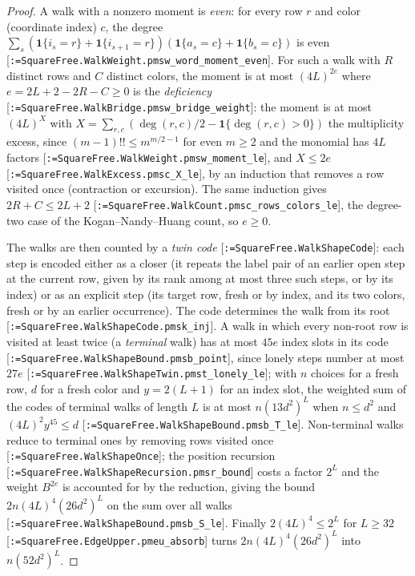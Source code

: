 \documentclass[11pt]{article}
\makeatletter
\newcommand{\formal@break}[1]{\@tfor\formal@tok:=#1\do{%
  \formal@tok
  \expandafter\ifx\formal@tok.\allowbreak\else
  \expandafter\ifx\formal@tok\_\allowbreak\fi\fi}}
\DeclareRobustCommand{\formal}[1]{\textnormal{[\texttt{\small\formal@break{#1}}]}}
\newcommand{\one}{\mathbf{1}}
\theoremstyle{plain}
\theoremstyle{definition}
\makeatother
\begin{document}
\begin{proof}
A walk with a nonzero moment is \emph{even}: for every row $r$ and color
(coordinate index) $c$, the degree
$\sum_s(\one\{i_s = r\} + \one\{i_{s+1} = r\})(\one\{a_s = c\} + \one\{b_s = c\})$
is even \formal{SquareFree.WalkWeight.pmsw\_word\_moment\_even}. For such a
walk with $R$ distinct rows and $C$ distinct colors, the moment is at most
$(4L)^{2e}$ where $e = 2L + 2 - 2R - C \ge 0$ is the \emph{deficiency}
\formal{SquareFree.WalkBridge.pmsw\_bridge\_weight}: the moment is at most
$(4L)^X$ with $X = \sum_{r,c}(\deg(r,c)/2 - \one\{\deg(r,c) > 0\})$ the
multiplicity excess, since $(m-1)!! \le m^{m/2 - 1}$ for even $m \ge 2$ and
the monomial has $4L$ factors \formal{SquareFree.WalkWeight.pmsw\_moment\_le},
and $X \le 2e$ \formal{SquareFree.WalkExcess.pmsc\_X\_le}, by an induction
that removes a row visited once (contraction or excursion). The same
induction gives $2R + C \le 2L + 2$ \formal{SquareFree.WalkCount.pmsc\_rows\_colors\_le},
the degree-two case of the Kogan--Nandy--Huang count, so $e \ge 0$.

The walks are then counted by a \emph{twin code}
\formal{SquareFree.WalkShapeCode}: each step is encoded either as a closer
(it repeats the label pair of an earlier open step at the current row,
given by its rank among at most three such steps, or by its index) or as
an explicit step (its target row, fresh or by index, and its two colors,
fresh or by an earlier occurrence). The code determines the walk from its
root \formal{SquareFree.WalkShapeCode.pmsk\_inj}. A walk in which every
non-root row is visited at least twice (a \emph{terminal} walk) has at most
$45e$ index slots in its code \formal{SquareFree.WalkShapeBound.pmsb\_point},
since lonely steps number at most $27e$ \formal{SquareFree.WalkShapeTwin.pmst\_lonely\_le};
with $n$ choices for a fresh row, $d$ for a fresh color and $y = 2(L+1)$
for an index slot, the weighted sum of the codes of terminal walks of
length $L$ is at most $n(13d^2)^L$ when $n \le d^2$ and
$(4L)^2y^{45} \le d$ \formal{SquareFree.WalkShapeBound.pmsb\_T\_le}.
Non-terminal walks reduce to terminal ones by removing rows visited once
\formal{SquareFree.WalkShapeOnce}; the position recursion
\formal{SquareFree.WalkShapeRecursion.pmsr\_bound} costs a factor $2^L$
and the weight $B^{2e}$ is accounted for by the reduction, giving the bound
$2n(4L)^4(26d^2)^L$ on the sum over all walks \formal{SquareFree.WalkShapeBound.pmsb\_S\_le}.
Finally $2(4L)^4 \le 2^L$ for $L \ge 32$ \formal{SquareFree.EdgeUpper.pmeu\_absorb}
turns $2n(4L)^4(26d^2)^L$ into $n(52d^2)^L$.
\end{proof}
\end{document}
